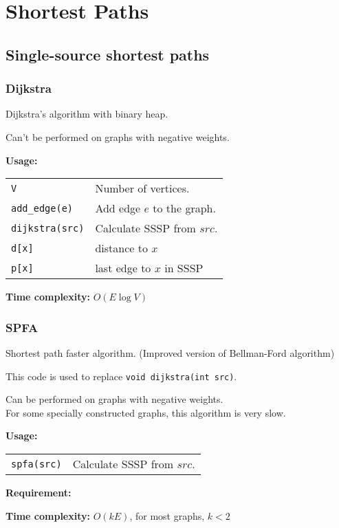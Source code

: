 
\newcommand{\BookNo}{1}
\newcommand{\BookTitle}{Graph Theory}


\setmainfont{Times New Roman}
\setlength{\parskip}{0.0in}
\tableofcontents
\setlength{\parskip}{0.1in}
\newevenpage
\section{Shortest Paths}

\subsection{Single-source shortest paths}
\subsubsection{Dijkstra} \label{dijkstra}
Dijkstra's algorithm with binary heap. \par
\Cross Can't be performed on graphs with negative weights.\par
\textbf{Usage:} \\[0.1cm]
\begin{tabular}{p{2.5cm} p{9cm}}
  \lstinline|V| & Number of vertices. \\
  \lstinline|add_edge(e)| & Add edge $e$ to the graph. \\
  \lstinline|dijkstra(src)| & Calculate SSSP from $src$.  \\
  \lstinline|d[x]| & distance to $x$ \\
  \lstinline|p[x]| & last edge to $x$ in SSSP  \\
\end{tabular} \par
\textbf{Time complexity:} $O(E \log V)$ \par


\subsubsection{SPFA}
Shortest path faster algorithm. (Improved version of Bellman-Ford algorithm) \par
This code is used to replace \lstinline|void dijkstra(int src)|. \par
\Tick Can be performed on graphs with negative weights. \\
\Warning For some specially constructed graphs, this algorithm is very slow. \par
\textbf{Usage:} \\[0.1cm]
\begin{tabular}{p{2.5cm} p{9cm}}
  \lstinline|spfa(src)| & Calculate SSSP from $src$.  \\
\end{tabular} \par
\textbf{Requirement:} \\
 \par
\textbf{Time complexity:} $O(kE)$, for most graphs, $k<2$ \par


